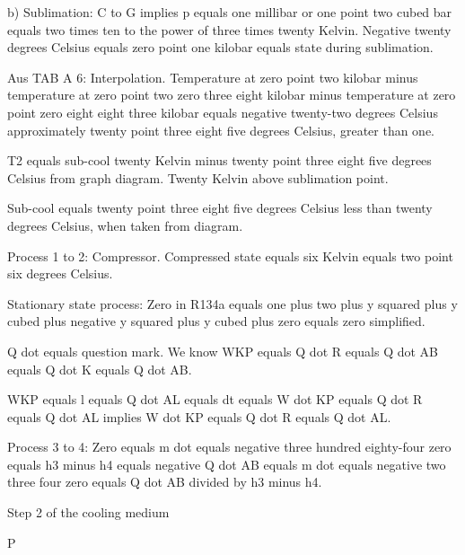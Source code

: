 b) Sublimation: C to G implies p equals one millibar or one point two cubed bar equals two times ten to the power of three times twenty Kelvin. Negative twenty degrees Celsius equals zero point one kilobar equals state during sublimation.

Aus TAB A 6: Interpolation. Temperature at zero point two kilobar minus temperature at zero point two zero three eight kilobar minus temperature at zero point zero eight eight three kilobar equals negative twenty-two degrees Celsius approximately twenty point three eight five degrees Celsius, greater than one.

T2 equals sub-cool twenty Kelvin minus twenty point three eight five degrees Celsius from graph diagram. Twenty Kelvin above sublimation point.

Sub-cool equals twenty point three eight five degrees Celsius less than twenty degrees Celsius, when taken from diagram.

Process 1 to 2: Compressor. Compressed state equals six Kelvin equals two point six degrees Celsius.

Stationary state process: Zero in R134a equals one plus two plus y squared plus y cubed plus negative y squared plus y cubed plus zero equals zero simplified.

Q dot equals question mark. We know WKP equals Q dot R equals Q dot AB equals Q dot K equals Q dot AB.

WKP equals l equals Q dot AL equals dt equals W dot KP equals Q dot R equals Q dot AL implies W dot KP equals Q dot R equals Q dot AL.

Process 3 to 4: Zero equals m dot equals negative three hundred eighty-four zero equals h3 minus h4 equals negative Q dot AB equals m dot equals negative two three four zero equals Q dot AB divided by h3 minus h4.

Step 2 of the cooling medium

P